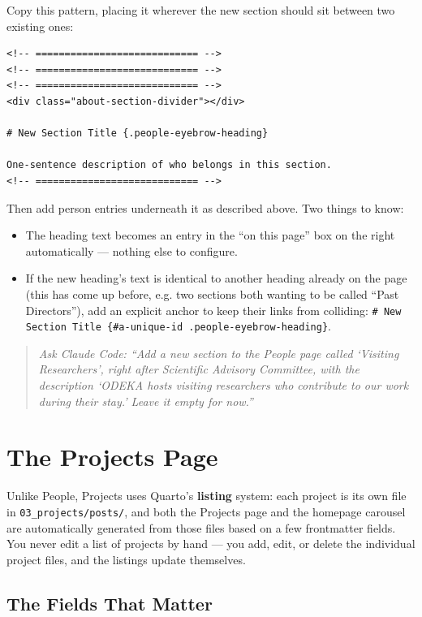 \documentclass[11pt]{article}
\newcommand{\term}[1]{\textbf{#1}}
\newcommand{\file}[1]{\texttt{#1}}
\newcommand{\cmd}[1]{\texttt{#1}}
\begin{document}
Copy this pattern, placing it wherever the new section should sit
between two existing ones:

\begin{lstlisting}
<!-- ============================ -->
<!-- ============================ -->
<!-- ============================ -->
<div class="about-section-divider"></div>

# New Section Title {.people-eyebrow-heading}

One-sentence description of who belongs in this section.
<!-- ============================ -->
\end{lstlisting}

Then add person entries underneath it as described above. Two things
to know:

\begin{itemize}
    \item The heading text becomes an entry in the ``on this page'' box
    on the right automatically --- nothing else to configure.
    \item If the new heading's text is identical to another heading
    already on the page (this has come up before, e.g. two sections
    both wanting to be called ``Past Directors''), add an explicit
    anchor to keep their links from colliding: \cmd{\# New Section
    Title \{\#a-unique-id .people-eyebrow-heading\}}.
\end{itemize}

\begin{quote}
\textit{Ask Claude Code: ``Add a new section to the People page called
`Visiting Researchers', right after Scientific Advisory Committee, with
the description `ODEKA hosts visiting researchers who contribute to our
work during their stay.' Leave it empty for now.''}
\end{quote}

\section{The Projects Page}
\label{sec:projects-page}

Unlike People, Projects uses Quarto's \term{listing} system: each
project is its own file in \file{03\_projects/posts/}, and both the
Projects page and the homepage carousel are automatically generated
from those files based on a few frontmatter fields. You never edit a
list of projects by hand --- you add, edit, or delete the individual
project files, and the listings update themselves.

\subsection{The Fields That Matter}
\end{document}
